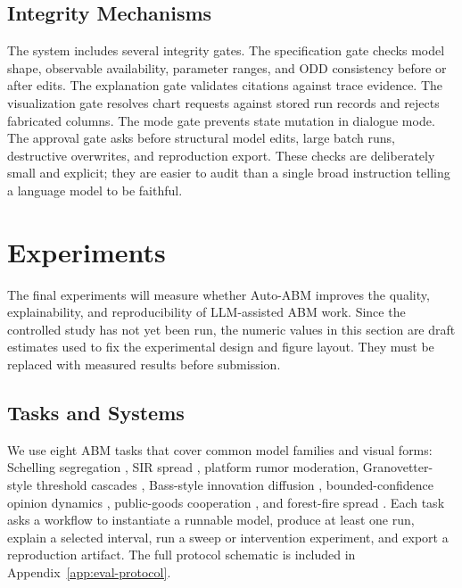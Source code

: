 \documentclass[11pt]{article}
\newcommand{\sys}{Auto-ABM}
\begin{document}
\subsection{Integrity Mechanisms}
\label{subsec:integrity}

The system includes several integrity gates. The specification gate checks model shape, observable availability, parameter ranges, and ODD consistency before or after edits. The explanation gate validates citations against trace evidence. The visualization gate resolves chart requests against stored run records and rejects fabricated columns. The mode gate prevents state mutation in dialogue mode. The approval gate asks before structural model edits, large batch runs, destructive overwrites, and reproduction export. These checks are deliberately small and explicit; they are easier to audit than a single broad instruction telling a language model to be faithful.

\section{Experiments}
\label{sec:evaluation}

The final experiments will measure whether \sys{} improves the quality, explainability, and reproducibility of LLM-assisted ABM work. Since the controlled study has not yet been run, the numeric values in this section are draft estimates used to fix the experimental design and figure layout. They must be replaced with measured results before submission.

\subsection{Tasks and Systems}
\label{subsec:eval-tasks}

We use eight ABM tasks that cover common model families and visual forms: Schelling segregation \citep{schelling1971segregation}, SIR spread \citep{kermack1927epidemics}, platform rumor moderation, Granovetter-style threshold cascades \citep{granovetter1978threshold}, Bass-style innovation diffusion \citep{bass1969new}, bounded-confidence opinion dynamics \citep{deffuant2000mixing}, public-goods cooperation \citep{nowak2006five}, and forest-fire spread \citep{drossel1992forest}. Each task asks a workflow to instantiate a runnable model, produce at least one run, explain a selected interval, run a sweep or intervention experiment, and export a reproduction artifact. The full protocol schematic is included in Appendix~\ref{app:eval-protocol}.
\end{document}
